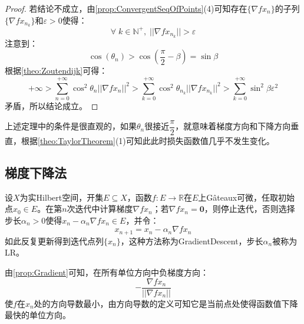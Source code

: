 \begin{proof}
	若结论不成立，由\cref{prop:ConvergentSeqOfPoints}(4)可知存在$\{\nabla fx_n\}$的子列$\{\nabla fx_{n_k}\}$和$\varepsilon>0$使得：
	\begin{equation*}
		\forall\;k\in\mathbb{N}^+,\;||\nabla fx_{n_k}||>\varepsilon
	\end{equation*}
	注意到：
	\begin{equation*}
		\cos(\theta_n)>\cos\left(\frac{\pi}{2}-\beta\right)=\sin\beta
	\end{equation*}
	根据\cref{theo:Zoutendijk}可得：
	\begin{equation*}
		+\infty>\sum_{n=0}^{+\infty}\cos^2\theta_n||\nabla fx_n||^2>\sum_{k=0}^{+\infty}\cos^2\theta_{n_k}||\nabla fx_{n_k}||^2>\sum_{k=0}^{+\infty}\sin^2\beta\varepsilon^2
	\end{equation*}
	矛盾，所以结论成立。
\end{proof}
\begin{note}
	上述定理中的条件是很直观的，如果$\theta_n$很接近$\dfrac{\pi}{2}$，就意味着梯度方向和下降方向垂直，根据\cref{theo:TaylorTheorem}(1)可知此此时损失函数值几乎不发生变化。
\end{note}

\subsection{梯度下降法}
\begin{method}\label{method:GradientDescent}
	设$X$为实Hilbert空间，开集$E\subseteq X$，函数$f:E\to\mathbb{R}$在$E$上G\^ateaux可微，任取初始点$x_0\in E$。在第$n$次迭代中计算梯度$\nabla fx_n$；若$\nabla fx_n=\mathbf{0}$，则停止迭代，否则选择步长$\alpha_n>0$使得$x_n-\alpha_n\nabla fx_n\in E$，并令：
	\begin{equation*}
		x_{n+1}=x_n-\alpha_n\nabla fx_n
	\end{equation*}
	如此反复更新得到迭代点列$\{x_n\}$，这种方法称为\gls{GradientDescent}，步长$\alpha_n$被称为\gls{LR}。
\end{method}
\begin{note}
	由\cref{prop:Gradient}可知，在所有单位方向中负梯度方向：
	\begin{equation*}
		-\frac{\nabla fx_n}{||\nabla fx_n||}
	\end{equation*}
	使$f$在$x_n$处的方向导数最小，由方向导数的定义可知它是当前点处使得函数值下降最快的单位方向。
\end{note}

